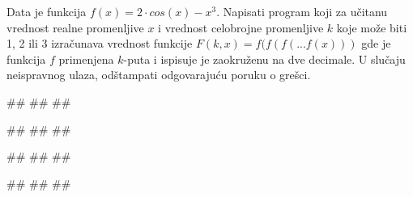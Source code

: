 \begin{Exercise}[label=p1.2_12] 
Data je funkcija $f(x) = 2 \cdot cos(x) - x^3$. Napisati program koji za učitanu vrednost realne promenljive $x$ i vrednost celobrojne promenljive $k$ koje može biti 1, 2 ili 3 izračunava
vrednost funkcije $F(k, x) = f(f(f(...f(x)))$ gde je funkcija $f$ primenjena $k$-puta i ispisuje je zaokruženu na dve decimale.
U slučaju neispravnog ulaza, odštampati odgovarajuću poruku o grešci.
\begin{miditest}
\begin{upotreba}{1}
#\naslovInt#
##
##
\end{upotreba}
\end{miditest}
\begin{miditest}
\begin{upotreba}{2}
#\naslovInt#
##
##
\end{upotreba}
\end{miditest}

\begin{miditest}
\begin{upotreba}{3}
#\naslovInt#
##
##
\end{upotreba}
\end{miditest}
\begin{miditest}
\begin{upotreba}{4}
#\naslovInt#
##
##
\end{upotreba}
\end{miditest}

\end{Exercise}
\begin{Answer}[ref=p1.2_12]
\end{Answer}





